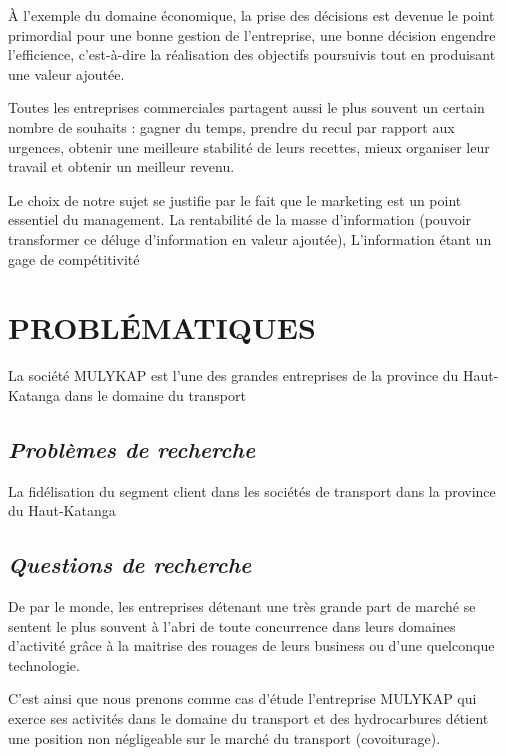 \documentclass[a4paper,12pt,oneside]{book}
\begin{document}
À l’exemple du domaine
économique, la prise des décisions est devenue
le point primordial pour une bonne gestion de
l’entreprise, une bonne décision engendre l’efficience,
c’est-à-dire la réalisation des objectifs
poursuivis tout en produisant une valeur ajoutée.
\newline

Toutes les entreprises commerciales partagent aussi
le plus souvent un certain nombre de souhaits : gagner
du temps, prendre du recul par rapport aux urgences, obtenir une meilleure
stabilité de leurs recettes, mieux organiser leur travail et obtenir un meilleur
revenu. \cite*{Barouch2010}
\newline

Le choix de notre sujet se justifie par le fait que le marketing 
est un point essentiel du management.
La rentabilité de la masse d’information (pouvoir transformer
ce déluge d’information en valeur ajoutée), L’information étant
un gage de compétitivité %

\section[Problématique]{PROBLÉMATIQUES}
La société MULYKAP est l’une des grandes entreprises
de la province du Haut-Katanga dans le domaine du transport
\subsection[Problèmes de recherche]{\textit{Problèmes de recherche}}
La fidélisation du segment client dans les sociétés de transport
dans la province du Haut-Katanga

\subsection[Questions de recherche]{\textit{Questions de recherche}}
De par le monde, les entreprises détenant une très grande part de marché
se sentent le plus souvent à l’abri de toute concurrence dans leurs domaines d’activité
grâce à la maitrise des rouages de leurs business ou
d’une quelconque technologie. \cite*{Rouviere2010} 
\newline

C’est ainsi que nous prenons comme cas d’étude l’entreprise MULYKAP qui exerce ses activités dans le domaine 
du transport et des hydrocarbures détient
une position non négligeable sur le marché du transport (covoiturage). \cite{Rouviere2010}
\newline
\end{document}
